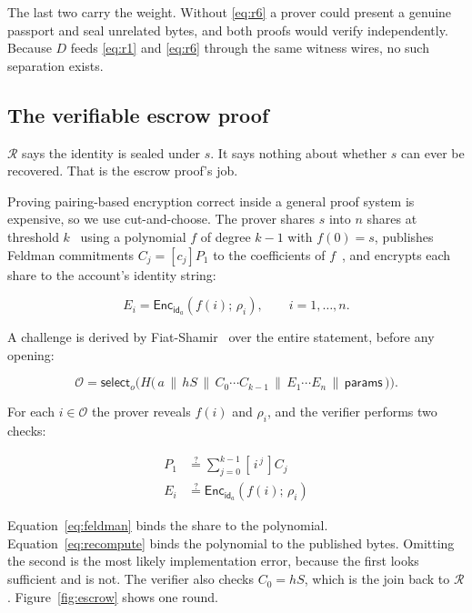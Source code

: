 \documentclass[11pt,a4paper]{article}
\begin{document}
The last two carry the weight. Without \ref{eq:r6} a prover could present a
genuine passport and seal unrelated bytes, and both proofs would verify
independently. Because $D$ feeds \ref{eq:r1} and \ref{eq:r6} through the same
witness wires, no such separation exists.

\subsection{The verifiable escrow proof}
\label{sec:escrowproof}

$\mathcal{R}$ says the identity is sealed under $s$. It says nothing about
whether $s$ can ever be recovered. That is the escrow proof's job.

Proving pairing-based encryption correct inside a general proof system is
expensive, so we use cut-and-choose. The prover shares $s$ into $n$ shares at
threshold $k$~\cite{shamir} using a polynomial $f$ of degree $k-1$ with
$f(0) = s$, publishes Feldman commitments $C_j = [c_j]P_1$ to the coefficients of
$f$~\cite{feldman}, and encrypts each share to the account's identity string:

\begin{equation}
E_i = \mathsf{Enc}_{\mathsf{id}_a}(f(i);\, \rho_i), \qquad i = 1,\dots,n.
\end{equation}

A challenge is derived by Fiat-Shamir~\cite{fiatshamir} over the entire
statement, before any opening:

\begin{equation}
\mathcal{O} = \mathsf{select}_o\Big(
  H\big(\, a \,\|\, hS \,\|\, C_0 \cdots C_{k-1} \,\|\, E_1 \cdots E_n \,\|\,
  \mathsf{params} \,\big)\Big).
\label{eq:challenge}
\end{equation}

For each $i \in \mathcal{O}$ the prover reveals $f(i)$ and $\rho_i$, and the
verifier performs two checks:

\begin{align}
[f(i)]P_1 &\overset{?}{=} \textstyle\sum_{j=0}^{k-1} [\,i^{\,j}\,] C_j
  \label{eq:feldman}\\
E_i &\overset{?}{=} \mathsf{Enc}_{\mathsf{id}_a}(f(i);\, \rho_i)
  \label{eq:recompute}
\end{align}

Equation~\ref{eq:feldman} binds the share to the polynomial.
Equation~\ref{eq:recompute} binds the polynomial to the published bytes. Omitting
the second is the most likely implementation error, because the first looks
sufficient and is not. The verifier also checks $C_0 = hS$, which is the join
back to $\mathcal{R}$. Figure~\ref{fig:escrow} shows one round.
\end{document}

